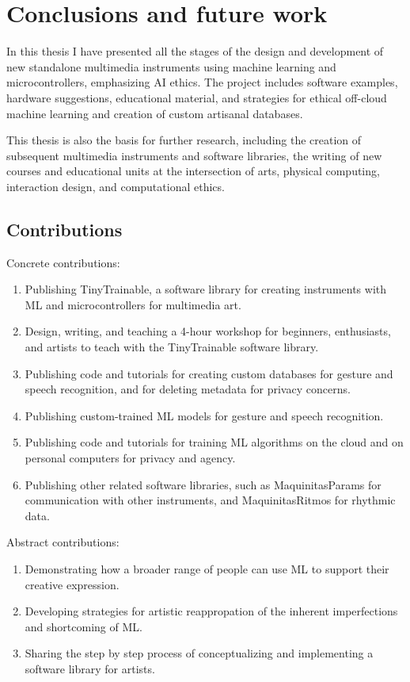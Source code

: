 \chapter{Conclusions and future work}

In this thesis I have presented all the stages of the design and development of new standalone multimedia instruments using machine learning and microcontrollers, emphasizing \acrshort{AI} ethics. The project includes software examples, hardware suggestions, educational material, and strategies for ethical off-cloud machine learning and creation of custom artisanal databases.

This thesis is also the basis for further research, including the creation of subsequent multimedia instruments and software libraries, the writing of new courses and educational units at the intersection of arts, physical computing, interaction design, and computational ethics.

\section{Contributions}

Concrete contributions:

\begin{enumerate}
  \item Publishing TinyTrainable, a software library for creating instruments with  \acrshort{ML} and microcontrollers for multimedia art.
  \item Design, writing, and teaching a 4-hour workshop for beginners, enthusiasts, and artists to teach with the TinyTrainable software library.
  \item Publishing code and tutorials for creating custom databases for gesture and speech recognition, and for deleting metadata for privacy concerns.
  \item Publishing custom-trained \acrshort{ML} models for gesture and speech recognition.
  \item Publishing code and tutorials for training \acrshort{ML} algorithms on the cloud and on personal computers for privacy and agency.
  \item Publishing other related software libraries, such as MaquinitasParams for communication with other instruments, and MaquinitasRitmos for rhythmic data.
\end{enumerate}

Abstract contributions:

\begin{enumerate}
 \item Demonstrating how a broader range of people can use \acrshort{ML} to support their creative expression.
 \item Developing strategies for artistic reappropation of the inherent imperfections and shortcoming of \acrshort{ML}.
 \item Sharing the step by step process of conceptualizing and implementing a software library for artists.
\end{enumerate}

